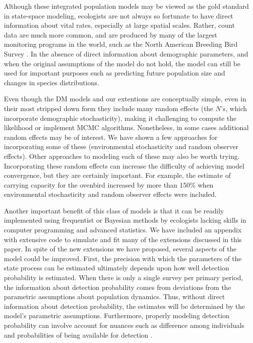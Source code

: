 \documentclass[12pt]{article}
\begin{document}

Although these integrated population models may be viewed as the gold standard in
state-space modeling, ecologists are not always so fortunate to have direct
information about vital rates, especially at large spatial scales.
Rather, count data are much more common, and
are produced by many of the largest monitoring programs in the
world, such as the North American Breeding Bird Survey
\citep[BBS;][]{robbins_etal:1986}.
In the absence of direct information about demographic parameters, and
when the original assumptions of the model do not hold, the
model can still be used for important purposes such as predicting future
population size and changes in species distributions.

Even though the DM models and our extentions are conceptually simple, even in
their most stripped down form they include many random effects (the $N$'s, which
incorporate demographic stochasticity), making it challenging to compute the likelihood 
or implement MCMC algorithms. Nonetheless, in some cases additional random effects
may be of interest.  We have shown a few approaches for incorporating some of these
(environmental stochasticity and random observer effects).  Other approaches to modeling
each of these may also be worth trying.  Incorporating these random effects can increase
the difficulty of achieving model convergence, but they are certainly important.
For example, the estimate of carrying capacity for the ovenbird increased by more than 150\%
when environmental stochasticity and random observer effects were included.  

Another important benefit of this class of models is that it can be
readily implemented using frequentist or Bayesian methods by
ecologists lacking skills in computer programming and advanced
statistics. We have included an appendix with extensive code to
simulate and fit many of the extensions discussed in this paper.
In spite of the new extensions we have proposed, several aspects of
the model could be improved. First, the precision with which the
parameters of the state process can be estimated ultimately depends
upon how well detection probability is estimated. When there is
only a single survey per primary period, the information about
detection probability comes from deviations from the parametric
assumptions about population dynamics. Thus, without direct information
about detection probability, the estimates will be determined by the
model's parametric assumptions. Furthermore, properly modeling detection
probability can involve account for nuances such as difference
among individuals and probabilities of being available for detection
\citep{nichols_etal:2009}.
\end{document}
